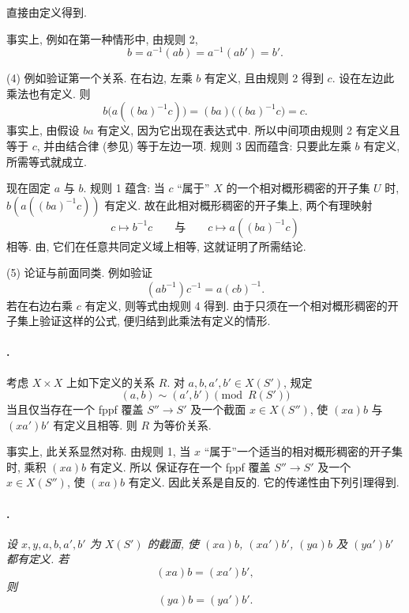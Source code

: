 \textup{} 直接由定义得到.

\textup{} 事实上, 例如在第一种情形中,
由规则 2,
\[
  b=a^{-1}(ab)=a^{-1}(ab')=b'.
\]

\textup{(4)} 例如验证第一个关系.
在右边, 左乘 \(b\) 有定义, 且由规则 2 得到 \(c\).
设在左边此乘法也有定义. 则
\[
  b\bigl(a((ba)^{-1}c)\bigr)
  =(ba)\bigl((ba)^{-1}c\bigr)
  =c.
\]
事实上, 由假设 \(ba\) 有定义, 因为它出现在表达式中.
所以中间项由规则 2 有定义且等于 \(c\),
并由结合律 (参见) 等于左边一项.
规则 3 因而蕴含: 只要此左乘 \(b\) 有定义, 所需等式就成立.

现在固定 \(a\) 与 \(b\).
规则 1 蕴含: 当 \(c\) “属于” \(X\) 的一个相对概形稠密的开子集 \(U\) 时,
\(b(a((ba)^{-1}c))\) 有定义.
故在此相对概形稠密的开子集上, 两个有理映射
\[
  c\longmapsto b^{-1}c
  \qquad\text{与}\qquad
  c\longmapsto a((ba)^{-1}c)
\]
相等. 由,
它们在任意共同定义域上相等, 这就证明了所需结论.

\textup{(5)} 论证与前面同类. 例如验证
\[
  (ab^{-1})c^{-1}=a(cb)^{-1}.
\]
若在右边右乘 \(c\) 有定义, 则等式由规则 4 得到.
由于只须在一个相对概形稠密的开子集上验证这样的公式,
便归结到此乘法有定义的情形.

\paragraph{.}
考虑 \(X\times X\) 上如下定义的关系 \(R\).
对 \(a,b,a',b'\in X(S')\), 规定
\[
  (a,b)\sim(a',b')\pmod{R(S')}
\]
当且仅当存在一个 fppf 覆盖 \(S''\to S'\)
及一个截面 \(x\in X(S'')\), 使 \((xa)b\) 与 \((xa')b'\) 有定义且相等.
则 \(R\) 为等价关系.

事实上, 此关系显然对称.
由规则 1, 当 \(x\) “属于”一个适当的相对概形稠密的开子集时, 乘积 \((xa)b\) 有定义.
所以 保证存在一个 fppf 覆盖 \(S''\to S'\)
及一个 \(x\in X(S'')\), 使 \((xa)b\) 有定义.
因此关系是自反的. 它的传递性由下列引理得到.

\paragraph{.}
\textit{设 \(x,y,a,b,a',b'\) 为 \(X(S')\) 的截面,
使 \((xa)b\), \((xa')b'\), \((ya)b\) 及 \((ya')b'\) 都有定义. 若
\[
  (xa)b=(xa')b',
\]
则
\[
  (ya)b=(ya')b'.
\]}

